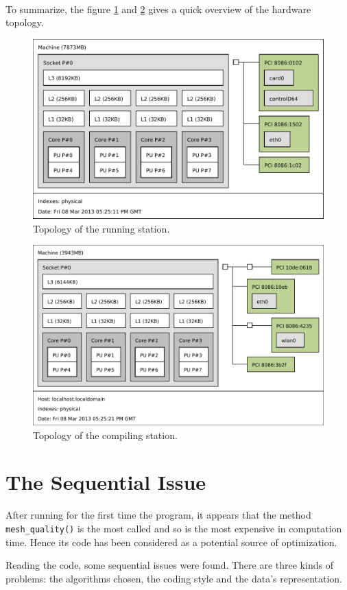 \documentclass[fleqn,11pt]{SelfArx} %
\begin{document}
\paragraph{}
To summarize, the figure \ref{topoR} and \ref{topoC} gives a quick overview of the hardware topology.

\begin{figure}[h]
	\centering

	\includegraphics[width=.48\textwidth]{run.pdf}

	\caption{Topology of the running station.}
	\label{topoR}
\end{figure}

\begin{figure}[h]
	\centering

	\includegraphics[width=.48\textwidth]{compile.pdf}

	\caption{Topology of the compiling station.}
	\label{topoC}
\end{figure}


\FloatBarrier
\section{The Sequential Issue}

After running for the first time the program, it appears that the method \verb+mesh_quality()+ is the most called and so is the most expensive in computation time. Hence its code has been considered as a potential source of optimization.

Reading the code, some sequential issues were found. There are three kinds of problems: the algorithms chosen, the coding style and the data's representation.
\end{document}
